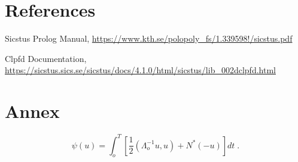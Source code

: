 \documentclass[runningheads,a4paper]{llncs}
\begin{document}
\section{References}

\begin{thebibliography}{2}

 Sicstus Prolog Manual, \url{https://www.kth.se/polopoly_fs/1.339598!/sicstus.pdf}

 Clpfd Documentation, \url{https://sicstus.sics.se/sicstus/docs/4.1.0/html/sicstus/lib_002dclpfd.html}

\end{thebibliography}


\section{Annex}

\begin{equation}
  \psi (u) = \int_{o}^{T} \left[\frac{1}{2}
  \left(\Lambda_{o}^{-1} u,u\right) + N^{\ast} (-u)\right] dt \;  .
\end{equation}
\end{document}
